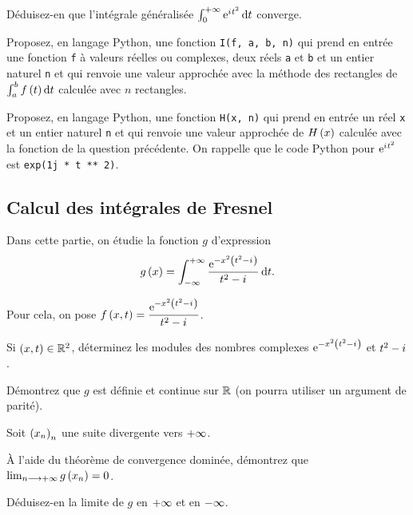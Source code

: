 \begin{q}
Déduisez-en que l'intégrale généralisée \(\int_0^{\pinf}\e{\i t^2}\odif{t}\) converge.
\end{q}

\begin{q}
Proposez, en langage Python, une fonction \verb|I(f, a, b, n)| qui prend en entrée une fonction \verb|f| à valeurs réelles ou complexes, deux réels \verb|a| et \verb|b| et un entier naturel \verb|n| et qui renvoie une valeur approchée avec la méthode des rectangles de \(\int_a^bf\paren{t}\odif{t}\) calculée avec \(n\) rectangles.
\end{q}

\begin{q}
Proposez, en langage Python, une fonction \verb|H(x, n)| qui prend en entrée un réel \verb|x| et un entier naturel \verb|n| et qui renvoie une valeur approchée de \(H\left(x\right)\) calculée avec la fonction de la question précédente. On rappelle que le code Python pour \(\mathrm{e}^{i\mkern1mu t^2}\) est \verb|exp(1j * t ** 2)|.
\end{q}

\subsection*{Calcul des intégrales de Fresnel}

Dans cette partie, on étudie la fonction \(g\) d'expression \[g\paren{x}=\int_{\minf}^{\pinf}\dfrac{\e{-x^2\paren{t^2-\i}}}{t^2-\i}\odif{t}.\]

Pour cela, on pose \(f\left(x,t\right)=\dfrac{\mathrm{e}^{-x^2\left(t^2-i\mkern1mu\right)}}{t^2-i\mkern1mu}\).

\begin{q}
Si \(\left(x,t\right)\in\mathbb{R}^2\), déterminez les modules des nombres complexes \(\mathrm{e}^{-x^2\left(t^2-i\mkern1mu\right)}\) et \(t^2-i\mkern1mu\).
\end{q}

\begin{q}
Démontrez que \(g\) est définie et continue sur \(\mathbb{R}\) (on pourra utiliser un argument de parité).
\end{q}

\begin{q}
Soit \(\left(x_n\right)_n\) une suite divergente vers \(+\infty\).

À l'aide du théorème de convergence dominée, démontrez que \(\lim_{n\longrightarrow+\infty}g\left(x_n\right)=0\).

Déduisez-en la limite de \(g\) en \(+\infty\) et en \(-\infty\).
\end{q}

